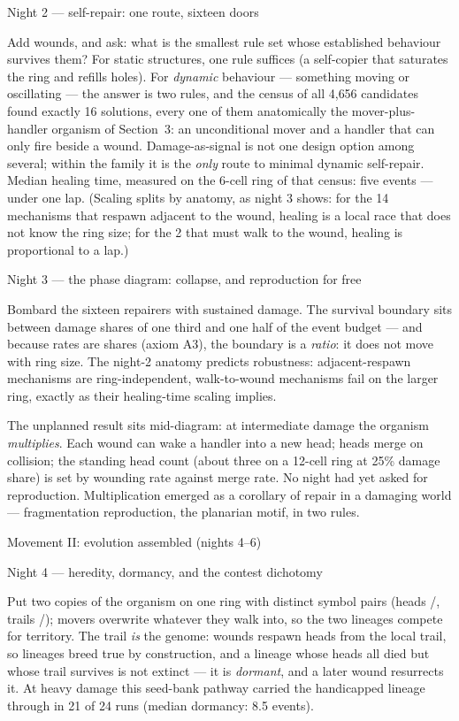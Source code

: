 \secc Night 2 --- self-repair: one route, sixteen doors

Add wounds, and ask: what is the smallest rule set whose
established behaviour survives them? For static structures, one
rule suffices (a self-copier that saturates the ring and refills
holes). For {\it dynamic} behaviour --- something moving or
oscillating --- the answer is two rules, and the census of all
4{,}656 candidates found exactly 16 solutions, every one of them
anatomically the mover-plus-handler organism of Section~3: an
unconditional mover and a handler that can only fire beside a
wound. Damage-as-signal is not one design option among several;
within the family it is the {\it only} route to minimal dynamic
self-repair. Median healing time, measured on the 6-cell ring of
that census: five events --- under one lap. (Scaling splits by
anatomy, as night 3 shows: for the 14 mechanisms that respawn
adjacent to the wound, healing is a local race that does not know
the ring size; for the 2 that must walk to the wound, healing is
proportional to a lap.)

\secc Night 3 --- the phase diagram: collapse, and reproduction for free

Bombard the sixteen repairers with sustained damage. The survival
boundary sits between damage shares of one third and one half of
the event budget --- and because rates are shares (axiom A3), the
boundary is a {\it ratio}: it does not move with ring size. The
night-2 anatomy predicts robustness: adjacent-respawn mechanisms
are ring-independent, walk-to-wound mechanisms fail on the larger
ring, exactly as their healing-time scaling implies.

The unplanned result sits mid-diagram: at intermediate damage the
organism {\it multiplies}. Each wound can wake a handler into a new
head; heads merge on collision; the standing head count (about
three on a 12-cell ring at 25\% damage share) is set by wounding
rate against merge rate. No night had yet asked for reproduction.
Multiplication emerged as a corollary of repair in a damaging
world --- fragmentation reproduction, the planarian motif, in two
rules.

\sec Movement II: evolution assembled (nights 4--6)

\secc Night 4 --- heredity, dormancy, and the contest dichotomy

Put two copies of the organism on one ring with distinct symbol
pairs (heads /, trails /); movers overwrite
whatever they walk into, so the two lineages compete for territory.
The trail {\it is} the genome: wounds respawn heads from the local
trail, so lineages breed true by construction, and a lineage whose
heads all died but whose trail survives is not extinct --- it is
{\it dormant}, and a later wound resurrects it. At heavy damage
this seed-bank pathway carried the handicapped lineage through in
21 of 24 runs (median dormancy: 8.5 events).

